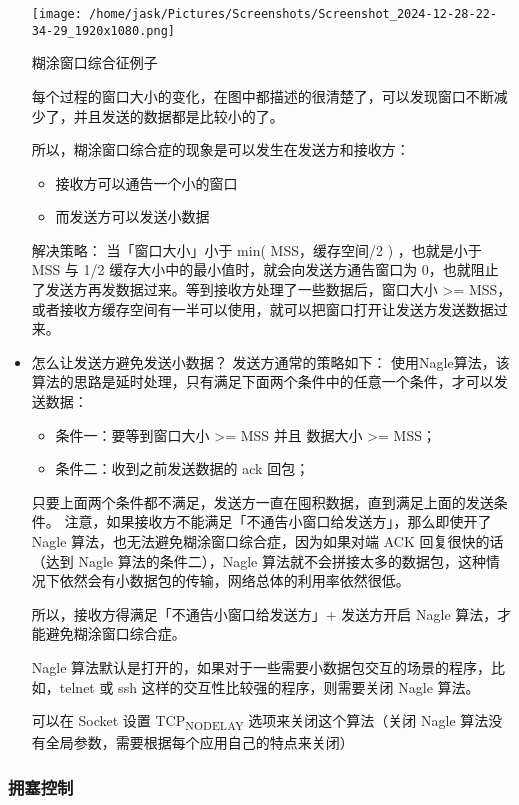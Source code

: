 \documentclass[11pt]{article}
\begin{document}
\begin{itemize}
\begin{center}
\texttt{[image: /home/jask/Pictures/Screenshots/Screenshot\_2024-12-28-22-34-29\_1920x1080.png]}
\end{center}
糊涂窗口综合征例子

每个过程的窗口大小的变化，在图中都描述的很清楚了，可以发现窗口不断减少了，并且发送的数据都是比较小的了。

所以，糊涂窗口综合症的现象是可以发生在发送方和接收方：
\begin{itemize}
\item 接收方可以通告一个小的窗口

\item 而发送方可以发送小数据
\end{itemize}

解决策略：
当「窗口大小」小于 min( MSS，缓存空间/2 ) ，也就是小于 MSS 与 1/2 缓存大小中的最小值时，就会向发送方通告窗口为 0，也就阻止了发送方再发数据过来。等到接收方处理了一些数据后，窗口大小 >= MSS，或者接收方缓存空间有一半可以使用，就可以把窗口打开让发送方发送数据过来。

\item 怎么让发送方避免发送小数据？
发送方通常的策略如下：
使用Nagle算法，该算法的思路是延时处理，只有满足下面两个条件中的任意一个条件，才可以发送数据：
\begin{itemize}
\item 条件一：要等到窗口大小 >= MSS 并且 数据大小 >= MSS；

\item 条件二：收到之前发送数据的 ack 回包；
\end{itemize}

只要上面两个条件都不满足，发送方一直在囤积数据，直到满足上面的发送条件。
注意，如果接收方不能满足「不通告小窗口给发送方」，那么即使开了 Nagle 算法，也无法避免糊涂窗口综合症，因为如果对端 ACK 回复很快的话（达到 Nagle 算法的条件二），Nagle 算法就不会拼接太多的数据包，这种情况下依然会有小数据包的传输，网络总体的利用率依然很低。

所以，接收方得满足「不通告小窗口给发送方」+ 发送方开启 Nagle 算法，才能避免糊涂窗口综合症。

Nagle 算法默认是打开的，如果对于一些需要小数据包交互的场景的程序，比如，telnet 或 ssh 这样的交互性比较强的程序，则需要关闭 Nagle 算法。

可以在 Socket 设置 TCP\textsubscript{NODELAY} 选项来关闭这个算法（关闭 Nagle 算法没有全局参数，需要根据每个应用自己的特点来关闭）
\end{itemize}
\subsubsection{拥塞控制}
\label{sec:org0fca2e2}
\end{document}
